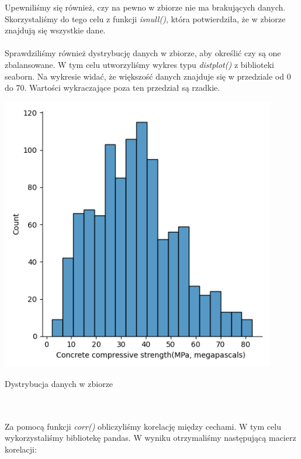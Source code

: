 \documentclass[11pt, a4paper, notitlepage]{report}
\begin{document}
Upewniliśmy się również, czy na pewno w zbiorze nie ma brakujących danych. Skorzystaliśmy do tego celu z funkcji \textit{isnull()}, która potwierdziła, że w zbiorze znajdują się wszystkie dane.
\\ \\
Sprawdziliśmy również dystrybucję danych w zbiorze, aby określić czy są one zbalansowane. W tym celu utworzyliśmy wykres typu \textit{distplot()} z biblioteki seaborn. Na wykresie widać, że większość danych znajduje się w przedziale od 0 do 70. Wartości wykraczające poza ten przedział są rzadkie.
\\
\begin{center}
	\includegraphics[width=0.9\textwidth]{graphics/data_analysis/target_distribution}
	\caption{Dystrybucja danych w zbiorze}
\end{center}
\\ \\
Za pomocą funkcji \textit{corr()} obliczyliśmy korelację między cechami. W tym celu wykorzystaliśmy bibliotekę pandas. W wyniku otrzymaliśmy następującą macierz korelacji:
\end{document}
